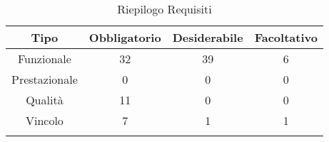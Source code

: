 \normalsize
\begin{longtable}{|c|c|c|c|}
\hline
\textbf{Tipo} & \textbf{Obbligatorio} & \textbf{Desiderabile} & \textbf{Facoltativo}\\
\hline
Funzionale & 32 & 39 & 6\\ \hline
Prestazionale & 0 & 0 & 0\\ \hline
Qualità & 11 & 0 & 0\\ \hline
Vincolo & 7 & 1 & 1\\ \hline
\caption[Riepilogo Requisiti]{Riepilogo Requisiti}
\label{tabella:riepilogorequi}
\end{longtable}
\clearpage